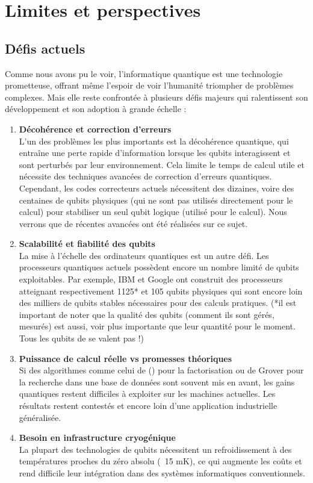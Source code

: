 \documentclass{article}
\begin{document}
\break\section{Limites et perspectives}

\subsection{Défis actuels}

Comme nous avons pu le voir, l’informatique quantique est une technologie prometteuse, offrant même l'espoir de voir l'humanité triompher de problèmes complexes. Mais elle reste confrontée à plusieurs défis majeurs qui ralentissent son développement et son adoption à grande échelle :  

\begin{enumerate}
  \item \textbf{Décohérence et correction d'erreurs} \\
  L’un des problèmes les plus importants est la décohérence quantique, qui entraîne une perte rapide d’information lorsque les qubits interagissent et sont perturbés par leur environnement. Cela limite le temps de calcul utile et nécessite des techniques avancées de correction d'erreurs quantiques. Cependant, les codes correcteurs actuels nécessitent des dizaines, voire des centaines de qubits physiques (qui ne sont pas utilisés directement pour le calcul) pour stabiliser un seul qubit logique (utilisé pour le calcul). Nous verrons que de récentes avancées ont été réalisées sur ce sujet. 

  \item \textbf{Scalabilité et fiabilité des qubits} \\
  La mise à l’échelle des ordinateurs quantiques est un autre défi. Les processeurs quantiques actuels possèdent encore un nombre limité de qubits exploitables. Par exemple, IBM et Google ont construit des processeurs atteignant respectivement 1125* et 105 qubits physiques qui sont encore loin des milliers de qubits stables nécessaires pour des calculs pratiques. (*il est important de noter que la qualité des qubits (comment ils sont gérés, mesurés) est aussi, voir plus importante que leur quantité pour le moment. Tous les qubits de se valent pas !)  

  \item \textbf{Puissance de calcul réelle vs promesses théoriques} \\
  Si des algorithmes comme celui de (\cite{wikipediaAlgorithmeShor}) pour la factorisation ou de Grover pour la recherche dans une base de données sont souvent mis en avant, les gains quantiques restent difficiles à exploiter sur les machines actuelles. Les résultats restent contestés et encore loin d’une application industrielle généralisée. 

  \item \textbf{Besoin en infrastructure cryogénique} \\
  La plupart des technologies de qubits nécessitent un refroidissement à des températures proches du zéro absolu (~15 mK), ce qui augmente les coûts et rend difficile leur intégration dans des systèmes informatiques conventionnels. 
\end{enumerate}
\end{document}

